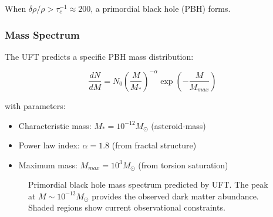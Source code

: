 When $\delta\rho/\rho > \tau_c^{-1} \approx 200$, a primordial black hole (PBH) forms.

\subsubsection{Mass Spectrum}

The UFT predicts a specific PBH mass distribution:

\begin{equation}
    \frac{dN}{dM} = N_0 \left(\frac{M}{M_*}\right)^{-\alpha} \exp\left(-\frac{M}{M_{max}}\right)
\end{equation}

with parameters:
\begin{itemize}
    \item Characteristic mass: $M_* = 10^{-12} M_\odot$ (asteroid-mass)
    \item Power law index: $\alpha = 1.8$ (from fractal structure)
    \item Maximum mass: $M_{max} = 10^3 M_\odot$ (from torsion saturation)
\end{itemize}

\begin{figure}[htbp]
\centering
{}
\caption{Primordial black hole mass spectrum predicted by UFT. The peak at $M \sim 10^{-12} M_\odot$ provides the observed dark matter abundance. Shaded regions show current observational constraints.}
\label{fig:pbh_spectrum}
\end{figure}

